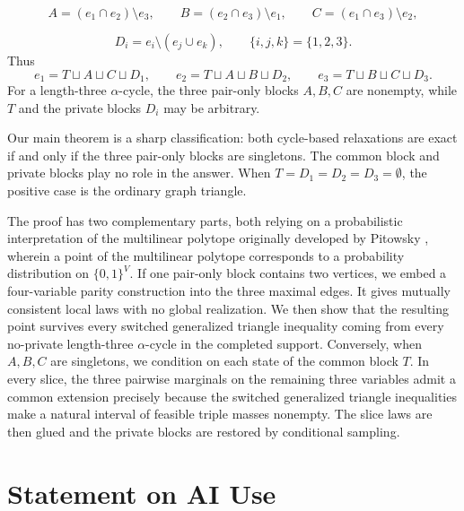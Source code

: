 \documentclass[11pt]{article}
\theoremstyle{definition}
\theoremstyle{remark}
\begin{document}
\begin{editedaiblock}
\[
A=(e_1\cap e_2)\setminus e_3,\qquad
B=(e_2\cap e_3)\setminus e_1,\qquad
C=(e_1\cap e_3)\setminus e_2,
\]

\[
D_i=e_i\setminus(e_j\cup e_k),\qquad \{i,j,k\}=\{1,2,3\}.
\]
Thus
\[
e_1=T\sqcup A\sqcup C\sqcup D_1,\qquad
e_2=T\sqcup A\sqcup B\sqcup D_2,\qquad
e_3=T\sqcup B\sqcup C\sqcup D_3.
\]
For a length-three $\alpha$-cycle, the three pair-only blocks $A,B,C$ are nonempty, while $T$ and the private blocks $D_i$ may be arbitrary.

Our main theorem is a sharp classification: both cycle-based relaxations are exact if and only if the three pair-only blocks are singletons. The common block and private blocks play no role in the answer. When $T=D_1=D_2=D_3=\emptyset$, the positive case is the ordinary graph triangle.

The proof has two complementary parts, both relying on a probabilistic interpretation of the multilinear polytope originally developed by Pitowsky \cite{pitowsky1991correlation}, wherein a point of the multilinear polytope corresponds to a probability distribution on $\{0,1\}^V$. If one pair-only block contains two vertices, we embed a four-variable parity construction into the three maximal edges. It gives mutually consistent local laws with no global realization. We then show that the resulting point survives every switched generalized triangle inequality coming from every no-private length-three $\alpha$-cycle in the completed support. Conversely, when $A,B,C$ are singletons, we condition on each state of the common block $T$. In every slice, the three pairwise marginals on the remaining three variables admit a common extension precisely because the switched generalized triangle inequalities make a natural interval of feasible triple masses nonempty. The slice laws are then glued and the private blocks are restored by conditional sampling.

\end{editedaiblock}




\section*{Statement on AI Use}
\end{document}
